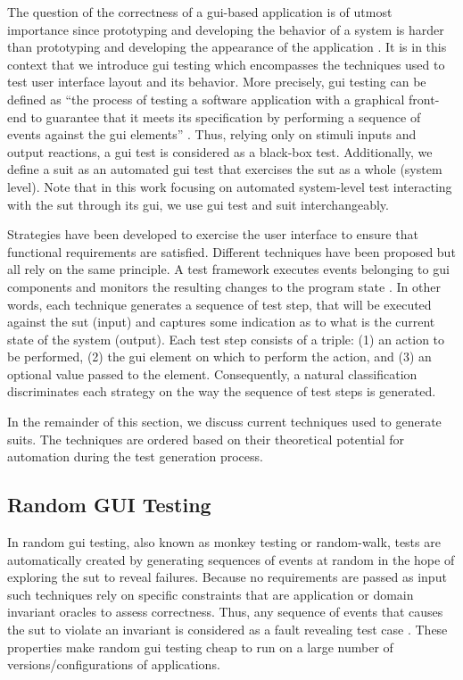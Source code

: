 The question of the correctness of a \gls{gui}-based application is of utmost importance since prototyping and developing the behavior of a system is harder than prototyping and developing the appearance of the application \cite{Myers2008}. It is in this context that we introduce \gls{gui} testing which encompasses the techniques used to test user interface layout and its behavior. More precisely, \gls{gui} testing can be defined as ``the process of testing a software application with a graphical front-end to guarantee that it meets its specification by performing a sequence of events against the \gls{gui} elements'' \cite{Cunha2010, Banerjee2013, Issa2012}. Thus, relying only on stimuli inputs and output reactions, a \gls{gui} test is considered as a black-box test. Additionally, we define a \gls{suit} as an automated \gls{gui} test that exercises the \gls{sut} as a whole (system level). Note that in this work focusing on automated system-level test interacting with the \gls{sut} through its \gls{gui}, we use \gls{gui} test and \gls{suit} interchangeably.

Strategies have been developed to exercise the user interface to ensure that functional requirements are satisfied. Different techniques have been proposed but all rely on the same principle. A test framework executes events belonging to \gls{gui} components and monitors the resulting changes to the program state \cite{Nguyen2014}. In other words, each technique generates a sequence of test step, that will be executed against the \gls{sut} (input) and captures some indication as to what is the current state of the system (output). Each test step consists of a triple: (1) an action to be performed, (2) the \gls{gui} element on which to perform the action, and (3) an optional value passed to the element. Consequently, a natural classification discriminates each strategy on the way the sequence of test steps is generated.

In the remainder of this section, we discuss current techniques used to generate \gls{suit}s. The techniques are ordered based on their theoretical potential for automation during the test generation process.

\subsection{Random GUI Testing}
\label{sec:introduction-random-gui-testing}

In random \gls{gui} testing, also known as monkey testing or random-walk, tests are automatically created by generating sequences of events at random in the hope of exploring the \gls{sut} to reveal failures. Because no requirements are passed as input such techniques rely on specific constraints that are application or domain invariant oracles \cite{Mesbah2009} to assess correctness. Thus, any sequence of events that causes the \gls{sut} to violate an invariant is considered as a fault revealing test case \cite{Barr2015}. These properties make random \gls{gui} testing cheap to run on a large number of versions/configurations of applications.

